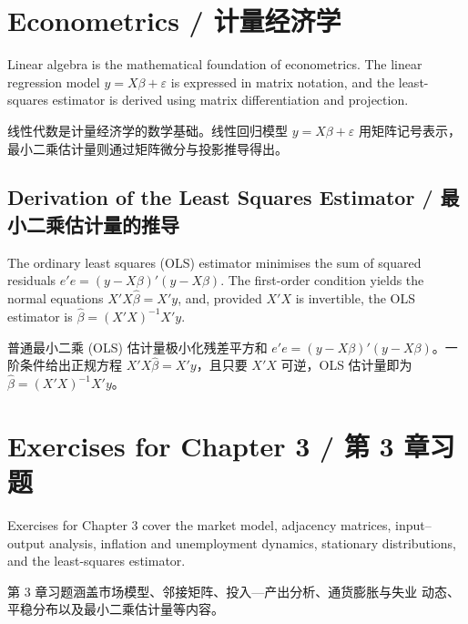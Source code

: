 \section{Econometrics / 计量经济学}

\begin{original}
Linear algebra is the mathematical foundation of econometrics.  The
linear regression model $y = X\beta + \varepsilon$ is expressed in
matrix notation, and the least-squares estimator is derived using
matrix differentiation and projection.
\end{original}
\begin{translation}
线性代数是计量经济学的数学基础。线性回归模型 $y = X\beta + \varepsilon$
用矩阵记号表示，最小二乘估计量则通过矩阵微分与投影推导得出。
\end{translation}

\subsection{Derivation of the Least Squares Estimator / 最小二乘估计量的推导}

\begin{original}
The ordinary least squares (OLS) estimator minimises the sum of squared
residuals $e'e = (y - X\beta)'(y - X\beta)$.  The first-order
condition yields the normal equations $X'X\hat{\beta} = X'y$, and,
provided $X'X$ is invertible, the OLS estimator is
$\hat{\beta} = (X'X)^{-1}X'y$.
\end{original}
\begin{translation}
普通最小二乘 (OLS) 估计量极小化残差平方和
$e'e = (y - X\beta)'(y - X\beta)$。一阶条件给出正规方程
$X'X\hat{\beta} = X'y$，且只要 $X'X$ 可逆，OLS 估计量即为
$\hat{\beta} = (X'X)^{-1}X'y$。
\end{translation}

\section*{Exercises for Chapter 3 / 第 3 章习题}

\begin{original}
Exercises for Chapter 3 cover the market model, adjacency matrices,
input–output analysis, inflation and unemployment dynamics, stationary
distributions, and the least-squares estimator.
\end{original}
\begin{translation}
第 3 章习题涵盖市场模型、邻接矩阵、投入—产出分析、通货膨胀与失业
动态、平稳分布以及最小二乘估计量等内容。
\end{translation}
